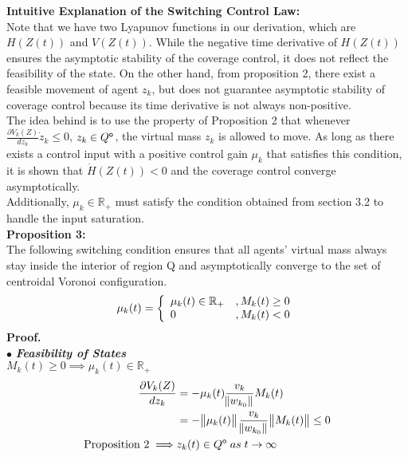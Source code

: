 \noindent \textbf{Intuitive Explanation of the Switching Control Law:} \\
Note that we have two Lyapunov functions in our derivation, which are ${H(Z(t))}$ and ${V(Z(t))}$. While the negative time derivative of $H(Z(t))$ ensures the asymptotic stability of the coverage control, it does not reflect the feasibility of the state. On the other hand, from proposition 2, there exist a feasible movement of agent $z_k$, but does not guarantee asymptotic stability of coverage control because its time derivative is not always non-positive. \\
The idea behind is to use the property of Proposition 2 that whenever $\frac{\partial V_k(Z)}{dz_k}\dot z_k \leq 0$, ${z_k \in Q^{\mathsf{o}}}$, the virtual mass ${z_k}$ is allowed to move. As long as there exists a control input with a positive control gain ${\mu_k}$ that satisfies this condition, it is shown that ${\dot H(Z(t)) < 0}$ and the coverage control converge asymptotically. \\
Additionally, ${\mu_k \in \mathbb{R}_+}$ must satisfy the condition obtained from section 3.2 to handle the input saturation. \\
\textbf{Proposition 3:} \\
The following switching condition ensures that all agents' virtual mass always stay inside the interior of region Q and asymptotically converge to the set of centroidal Voronoi configuration. \\ 
\begin{equation} \label{switching_law}
\begin{split} 
\mu_k(t) = \left\{ \begin{array}{ll} \mu_k(t) \in \mathbb{R}_+ & , M_k(t) \geq 0 \\ 0 & , M_k(t) < 0 \end{array} \right.
\end{split}
\end{equation}
\noindent \textbf{Proof.} \\
$\bullet$ \textbf{\textit{Feasibility of States}} \\
\noindent \underline{${M_k(t) \geq 0 \implies \mu_k(t) \in \mathbb{R}_+}$} \\
\begin{equation} \notag
\begin{split} 
\frac{\partial V_k(Z)}{dz_k} & = -\mu_k(t)\frac{v_k}{\norm{w_{k_0}}} M_k(t) \\
& = -\norm{\mu_k(t)}\frac{v_k}{\norm{w_{k_0}}} \norm{M_k(t)} \leq 0 \\
\text{Proposition 2} \implies & z_k(t) \in \interior Q \txtspc{as} t \rightarrow \infty 
\end{split}
\end{equation}

